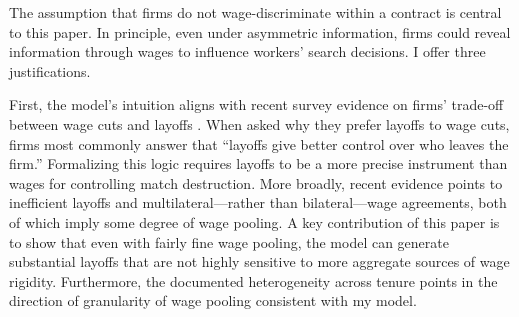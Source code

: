 
The assumption that firms do not wage-discriminate within a contract is central to this paper. In principle, even under asymmetric information, firms could reveal information through wages to influence workers’ search decisions. I offer three justifications.

First, the model’s intuition aligns with recent survey evidence on firms’ trade-off between wage cuts and layoffs \parencite{bertheau2025}. When asked why they prefer layoffs to wage cuts, firms most commonly answer that “layoffs give better control over who leaves the firm.” Formalizing this logic requires layoffs to be a more precise instrument than wages for controlling match destruction. More broadly, recent evidence \parencite[]{jager2022,bertheau2025,davis2025} points to inefficient layoffs and multilateral—rather than bilateral—wage agreements, both of which imply some degree of wage pooling. A key contribution of this paper is to show that even with fairly fine wage pooling, the model can generate substantial layoffs that are not highly sensitive to more aggregate sources of wage rigidity. Furthermore, the documented heterogeneity across tenure points in the direction of granularity of wage pooling consistent with my model.


